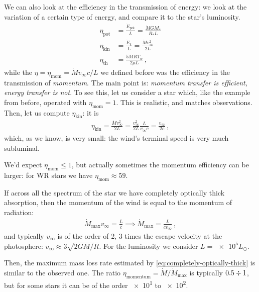 \documentclass[main.tex]{subfiles}
\begin{document}
We can also look at the efficiency in the transmission of energy: we look at the variation of a certain type of energy, and compare it to the star's luminosity. 
%
\begin{subequations}
\begin{align}
  \eta _{\text{pot}} &= \frac{\dot{E}_{\text{pot}}}{L}  = \frac{\dot{M} G M_{*}}{R_{*}L}  \\
  \eta _{\text{kin}} &= \frac{\dot{E}_k}{L} = \frac{\dot{M} v_{\infty}^2}{2L}  \\
  \eta _{\text{th}} &= \frac{5 \dot{M} R T_w}{2 \mu L} 
  \,,
\end{align}
\end{subequations}
%
while the \(\eta = \eta _{\text{mom}} = \dot{M} v_{ \infty }c / L\) we defined before was the efficiency in the transmission of \emph{momentum}. 
The main point is: \emph{momentum transfer is efficient, energy transfer is not}. 
To see this, let us consider a star which, like the example from before, operated with \(\eta_{\text{mom}} = 1\). This is realistic, and matches observations.
Then, let us compute \(\eta _{\text{kin}}\): it is 
%
\begin{align}
\eta _{\text{kin}} = \frac{\dot{M} v_{ \infty }^2}{2L}
= \frac{v_{ \infty }^2}{2L} \frac{L}{v_{ \infty }c}=
\frac{v_{ \infty }}{2c}
\,,
\end{align}
%
which, as we know, is very small: the wind's terminal speed is very much subluminal.


We'd expect \(\eta _{\text{mom}} \leq 1\), but actually sometimes the momentum efficiency can be larger: for WR stars we have \(\eta _{\text{mom}} \approx 59\).

If across all the spectrum of the star we have completely optically thick absorption, then the momentum of the wind is equal to the momentum of radiation: 
%
\begin{align} \label{eq:completely-optically-thick}
  \dot{M} _{\text{max}} v_{\infty} = \frac{L}{c} 
  \implies \dot{M} _{\text{max}} = \frac{L}{c v_{\infty}}
\,,
\end{align}
%
and typically \(v_{\infty}\) is of the order of 2, 3 times the escape velocity at the photosphere: \(v_{\infty} \approx 3 \sqrt{2 GM / R}\).
For the luminosity we consider \(L = \num{e5} L_{\odot}\).

Then, the maximum mass loss rate estimated by \eqref{eq:completely-optically-thick} is similar to the observed one. The ratio \(\eta _{\text{momentum}} = \dot{M} / \dot{M} _{\text{max}}\) is typically \(0.5 \divisionsymbol 1 \), but for some stars it can be of the order \num{e1} to \num{e2}.
\end{document}
